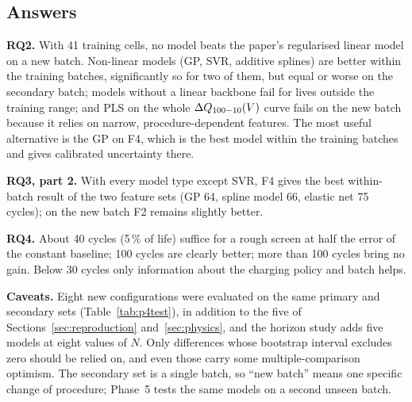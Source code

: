 \subsection{Answers}
\textbf{RQ2.} With 41 training cells, no model beats the paper's
regularised linear model on a new batch. Non-linear models (GP, SVR, additive
splines) are better within the training batches, significantly so for two of
them, but equal or worse on the secondary batch; models without a linear
backbone fail for lives outside the training range; and PLS on the whole
$\Delta Q_{100-10}(V)$ curve fails on the new batch because it relies on narrow,
procedure-dependent features. The most useful alternative is the GP on F4,
which is the best model within the training batches and gives calibrated
uncertainty there.

\textbf{RQ3, part 2.} With every model type except SVR, F4 gives the best
within-batch result of the two feature sets (GP 64, spline model 66, elastic net
75 cycles); on the new batch F2 remains slightly better.

\textbf{RQ4.} About 40 cycles (5\,\% of life) suffice for a rough screen at
half the error of the constant baseline; 100 cycles are clearly better; more
than 100 cycles bring no gain. Below 30 cycles only information about the
charging policy and batch helps.

\textbf{Caveats.} Eight new configurations were evaluated on the same
primary and secondary sets (Table~\ref{tab:p4test}), in addition to the five
of Sections~\ref{sec:reproduction} and~\ref{sec:physics}, and the horizon
study adds five models at eight values of $N$. Only differences whose
bootstrap interval excludes zero should be relied on, and even those carry
some multiple-comparison optimism. The secondary set
is a single batch, so ``new batch'' means one specific change of procedure;
Phase~5 tests the same models on a second unseen batch.
